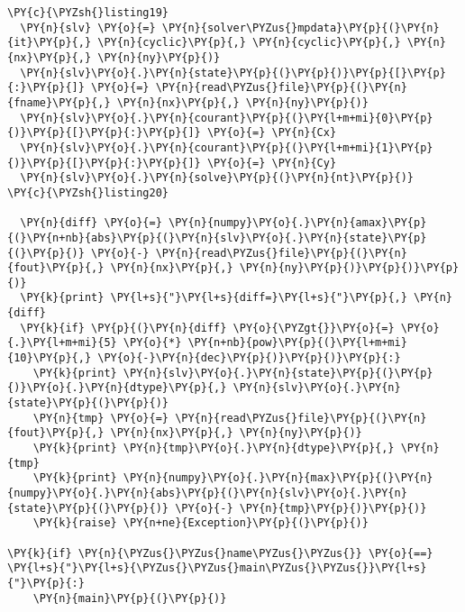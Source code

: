 \begin{Verbatim}[commandchars=\\\{\}]
\PY{c}{\PYZsh{}listing19}
  \PY{n}{slv} \PY{o}{=} \PY{n}{solver\PYZus{}mpdata}\PY{p}{(}\PY{n}{it}\PY{p}{,} \PY{n}{cyclic}\PY{p}{,} \PY{n}{cyclic}\PY{p}{,} \PY{n}{nx}\PY{p}{,} \PY{n}{ny}\PY{p}{)}
  \PY{n}{slv}\PY{o}{.}\PY{n}{state}\PY{p}{(}\PY{p}{)}\PY{p}{[}\PY{p}{:}\PY{p}{]} \PY{o}{=} \PY{n}{read\PYZus{}file}\PY{p}{(}\PY{n}{fname}\PY{p}{,} \PY{n}{nx}\PY{p}{,} \PY{n}{ny}\PY{p}{)}
  \PY{n}{slv}\PY{o}{.}\PY{n}{courant}\PY{p}{(}\PY{l+m+mi}{0}\PY{p}{)}\PY{p}{[}\PY{p}{:}\PY{p}{]} \PY{o}{=} \PY{n}{Cx}
  \PY{n}{slv}\PY{o}{.}\PY{n}{courant}\PY{p}{(}\PY{l+m+mi}{1}\PY{p}{)}\PY{p}{[}\PY{p}{:}\PY{p}{]} \PY{o}{=} \PY{n}{Cy}
  \PY{n}{slv}\PY{o}{.}\PY{n}{solve}\PY{p}{(}\PY{n}{nt}\PY{p}{)}
\PY{c}{\PYZsh{}listing20}

  \PY{n}{diff} \PY{o}{=} \PY{n}{numpy}\PY{o}{.}\PY{n}{amax}\PY{p}{(}\PY{n+nb}{abs}\PY{p}{(}\PY{n}{slv}\PY{o}{.}\PY{n}{state}\PY{p}{(}\PY{p}{)} \PY{o}{-} \PY{n}{read\PYZus{}file}\PY{p}{(}\PY{n}{fout}\PY{p}{,} \PY{n}{nx}\PY{p}{,} \PY{n}{ny}\PY{p}{)}\PY{p}{)}\PY{p}{)}
  \PY{k}{print} \PY{l+s}{"}\PY{l+s}{diff=}\PY{l+s}{"}\PY{p}{,} \PY{n}{diff}
  \PY{k}{if} \PY{p}{(}\PY{n}{diff} \PY{o}{\PYZgt{}}\PY{o}{=} \PY{o}{.}\PY{l+m+mi}{5} \PY{o}{*} \PY{n+nb}{pow}\PY{p}{(}\PY{l+m+mi}{10}\PY{p}{,} \PY{o}{-}\PY{n}{dec}\PY{p}{)}\PY{p}{)}\PY{p}{:} 
    \PY{k}{print} \PY{n}{slv}\PY{o}{.}\PY{n}{state}\PY{p}{(}\PY{p}{)}\PY{o}{.}\PY{n}{dtype}\PY{p}{,} \PY{n}{slv}\PY{o}{.}\PY{n}{state}\PY{p}{(}\PY{p}{)}
    \PY{n}{tmp} \PY{o}{=} \PY{n}{read\PYZus{}file}\PY{p}{(}\PY{n}{fout}\PY{p}{,} \PY{n}{nx}\PY{p}{,} \PY{n}{ny}\PY{p}{)}
    \PY{k}{print} \PY{n}{tmp}\PY{o}{.}\PY{n}{dtype}\PY{p}{,} \PY{n}{tmp}
    \PY{k}{print} \PY{n}{numpy}\PY{o}{.}\PY{n}{max}\PY{p}{(}\PY{n}{numpy}\PY{o}{.}\PY{n}{abs}\PY{p}{(}\PY{n}{slv}\PY{o}{.}\PY{n}{state}\PY{p}{(}\PY{p}{)} \PY{o}{-} \PY{n}{tmp}\PY{p}{)}\PY{p}{)}
    \PY{k}{raise} \PY{n+ne}{Exception}\PY{p}{(}\PY{p}{)}

\PY{k}{if} \PY{n}{\PYZus{}\PYZus{}name\PYZus{}\PYZus{}} \PY{o}{==} \PY{l+s}{"}\PY{l+s}{\PYZus{}\PYZus{}main\PYZus{}\PYZus{}}\PY{l+s}{"}\PY{p}{:}
    \PY{n}{main}\PY{p}{(}\PY{p}{)}
\end{Verbatim}
